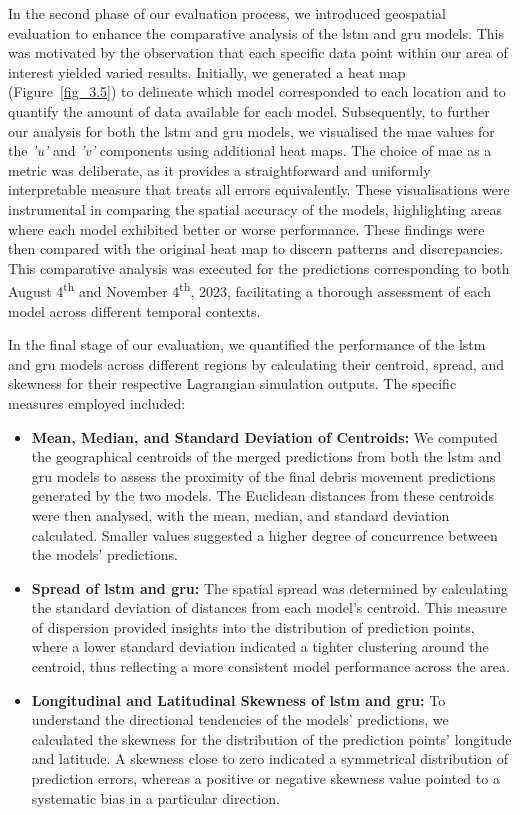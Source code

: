 In the second phase of our evaluation process, we introduced geospatial evaluation to enhance the comparative analysis of the \acrshort{lstm} and \acrshort{gru} models. This was motivated by the observation that each specific data point within our area of interest yielded varied results. Initially, we generated a heat map (Figure~\ref{fig_3.5}) to delineate which model corresponded to each location and to quantify the amount of data available for each model. Subsequently, to further our analysis for both the \acrshort{lstm} and \acrshort{gru} models, we visualised the \acrshort{mae} values for the \textit{'u'} and \textit{'v'} components using additional heat maps. The choice of \acrshort{mae} as a metric was deliberate, as it provides a straightforward and uniformly interpretable measure that treats all errors equivalently. These visualisations were instrumental in comparing the spatial accuracy of the models, highlighting areas where each model exhibited better or worse performance. These findings were then compared with the original heat map to discern patterns and discrepancies. This comparative analysis was executed for the predictions corresponding to both August 4\textsuperscript{th} and November 4\textsuperscript{th}, 2023, facilitating a thorough assessment of each model across different temporal contexts.

In the final stage of our evaluation, we quantified the performance of the \acrshort{lstm} and \acrshort{gru} models across different regions by calculating their centroid, spread, and skewness for their respective Lagrangian simulation outputs. The specific measures employed included:

\begin{itemize}
    \item \textbf{Mean, Median, and Standard Deviation of Centroids:} We computed the geographical centroids of the merged predictions from both the \acrshort{lstm} and \acrshort{gru} models to assess the proximity of the final debris movement predictions generated by the two models. The Euclidean distances from these centroids were then analysed, with the mean, median, and standard deviation calculated. Smaller values suggested a higher degree of concurrence between the models' predictions.
    \item \textbf{Spread of \acrshort{lstm} and \acrshort{gru}:} The spatial spread was determined by calculating the standard deviation of distances from each model's centroid. This measure of dispersion provided insights into the distribution of prediction points, where a lower standard deviation indicated a tighter clustering around the centroid, thus reflecting a more consistent model performance across the area.
    \item \textbf{Longitudinal and Latitudinal Skewness of \acrshort{lstm} and \acrshort{gru}:} To understand the directional tendencies of the models' predictions, we calculated the skewness for the distribution of the prediction points' longitude and latitude. A skewness close to zero indicated a symmetrical distribution of prediction errors, whereas a positive or negative skewness value pointed to a systematic bias in a particular direction.
\end{itemize}

